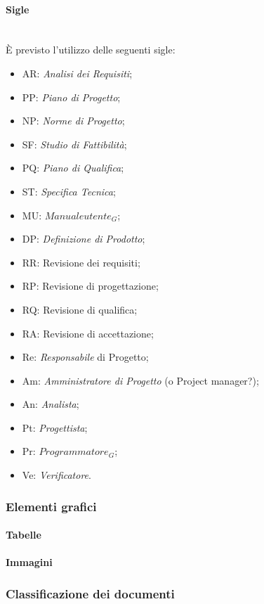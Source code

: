 		\paragraph{Sigle} \mbox{} \\
		È previsto l’utilizzo delle seguenti sigle:
		\begin{itemize}
			\item AR: \textit{Analisi dei Requisiti};
			\item PP: \textit{Piano di Progetto};
			\item NP: \textit{Norme di Progetto};
			\item SF: \textit{Studio di Fattibilità};
			\item PQ: \textit{Piano di Qualifica};
			\item ST: \textit{Specifica Tecnica};
			\item MU: \textit{$Manuale utente_G$};	
			\item DP: \textit{Definizione di Prodotto};
			\item RR: Revisione dei requisiti;
			\item RP: Revisione di progettazione;
			\item RQ: Revisione di qualifica;
			\item RA: Revisione di accettazione;
			\item Re: \textit{Responsabile} di Progetto;
			\item Am: \textit{Amministratore di Progetto} (o Project manager?);
			\item An: \textit{Analista};
			\item Pt: \textit{Progettista};
			\item Pr: \textit{$Programmatore_G$};
			\item Ve: \textit{Verificatore}.
		\end{itemize}
		
	\subsubsection{Elementi grafici}
		\paragraph{Tabelle}
		\paragraph{Immagini}
	\subsubsection{Classificazione dei documenti}
